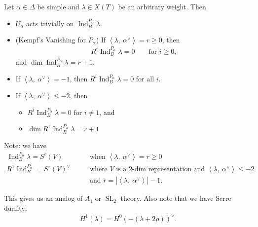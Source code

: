 \begin{proposition}[?]

Let \(\alpha\in\Delta\) be simple and \(\lambda \in X(T)\) be an
arbitrary weight. Then

\begin{itemize}
\item
  \(U_\alpha\) acts trivially on
  \(\operatorname{Ind}_B^{P_\alpha} \lambda\).
\item
  (Kempf's Vanishing for \(P_\alpha\)) If
  \({\left\langle {\lambda},~{\alpha^\vee} \right\rangle} = r \geq 0\),
  then
  \begin{align*}  
  R^i \operatorname{Ind}_B^{P_\alpha} \lambda = 0 \qquad \text{for } i \geq 0
  ,\end{align*}
  and \(\dim \operatorname{Ind}_B^{P_\alpha}\lambda = r + 1\).
\item
  If \({\left\langle {\lambda},~{\alpha^\vee} \right\rangle} = -1\),
  then \(R^i \operatorname{Ind}_B^{P_\alpha} \lambda = 0\) for all
  \(i\).
\item
  If \({\left\langle {\lambda},~{\alpha^\vee} \right\rangle} \leq -2\),
  then

  \begin{itemize}
  \item
    \(R^i \operatorname{Ind}_B^{P_\alpha} \lambda = 0\) for
    \(i \neq 1\), and
  \item
    \(\dim R^1 \operatorname{Ind}_B^{P_\alpha} \lambda = r+1\)
  \end{itemize}
\end{itemize}

Note: we have
\begin{align*}  
\operatorname{Ind}_B^{P_\alpha} \lambda = S^r(V) \qquad &\text{when } {\left\langle {\lambda},~{\alpha^\vee} \right\rangle} = r \geq 0 \\
R^1 \operatorname{Ind}_B^{P_\alpha} = S^r(V)^\vee\qquad&\text{where $V$ is a 2-dim representation and } {\left\langle {\lambda},~{\alpha^\vee} \right\rangle} \leq -2 \\
&\text{and } r = {\left\lvert {{\left\langle {\lambda},~{\alpha^\vee} \right\rangle}} \right\rvert} - 1
.\end{align*}

\end{proposition}

This gives us an analog of \(A_1\) or \({\operatorname{SL}}_2\) theory.
Also note that we have Serre duality:
\begin{align*}  
H^1(\lambda) = H^0( - (\lambda + 2\rho) )^\vee
.\end{align*}

